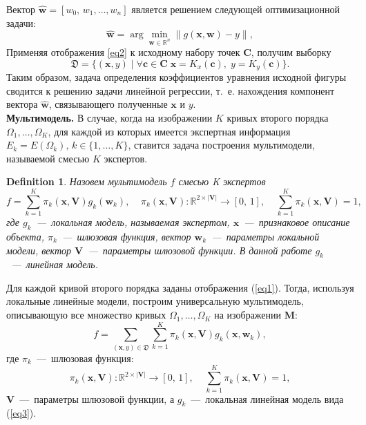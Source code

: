 \documentclass[12pt,twoside]{article}
\newtheorem{definition}{Definition}
\begin{document}
Вектор $\hat{\mathbf{w}}= [w_0, \, w_1, \dots, w_n]$ является решением следующей оптимизационной задачи:  \begin{equation} \hat{\mathbf{w}} = \arg\min_{\mathbf{w}\in\mathbb{R}^n} \|g(\mathbf{x}, \mathbf{w}) - y \|, \end{equation} 
Применяя отображения \eqref{eq2} к исходному набору точек $\mathbf{C}$, получим выборку 
\begin{equation}\label{eq4}
    \mathfrak{D} = \{(\mathbf{x}, y) \; | \; \forall \mathbf{c} \in \mathbf{C} \; \mathbf{x} = K_x(\mathbf{c}), \; y = K_y(\mathbf{c}) \}.
    \end{equation} 
    Таким образом, задача определения коэффициентов уравнения исходной фигуры сводится к решению задачи линейной регрессии, т.~е. нахождения компонент вектора $\hat{\mathbf{w}}$, связывающего полученные $\mathbf{x}$ и $y$. \\
\textbf{Мультимодель.} В случае, когда на изображении $K$ кривых второго порядка  $\Omega_1, \dots, \Omega_K$, для каждой из которых имеется экспертная информация $E_k = E(\Omega_k), \, k \in \{1, \dots, K\}$, ставится задача построения мультимодели, называемой смесью $K$ экспертов. 
\begin{definition} Назовем мультимодель $f$ смесью K экспертов \begin{equation}
  f = \sum\limits_{k = 1}^{K}\pi_k(\mathbf{x}, \mathbf{V})g_k(\mathbf{w}_k),  \; \; \; \; \pi_k(\mathbf{x}, \mathbf{V}): \mathbb{R}^{2\times |\mathbf{V}|} \rightarrow [0, \, 1], \; \; \; \; \sum\limits_{k = 1}^{K}\pi_k(\mathbf{x}, \mathbf{V}) = 1, 
\end{equation} где $g_k$~---~локальная модель, называемая экспертом, $\mathbf{x}$~---~признаковое описание объекта, $\pi_k$~---~шлюзовая функция, вектор $\mathbf{w}_k$~---~параметры локальной модели, вектор $\mathbf{V}$~---~параметры шлюзовой функции. В данной работе $g_k$~---~линейная модель. \end{definition}

Для каждой кривой второго порядка заданы отображения (\ref{eq1}). Тогда, используя локальные линейные модели, построим универсальную мультимодель, описывающую все множество кривых $\Omega_1, \dots, \Omega_K$ на изображении $\mathbf{M}$:
\begin{equation}\label{5}
f = \sum\limits_{(\mathbf{x}, y) \in \mathfrak{D}} \sum\limits_{k = 1}^{K} \pi_k(\mathbf{x}, \mathbf{V})g_k(\mathbf{x}, \mathbf{w}_k), 
\end{equation} где $\pi_k$~---~шлюзовая функция: 
\begin{equation}\label{6}
\pi_k(\mathbf{x}, \mathbf{V}): \mathbb{R}^{2\times |\mathbf{V}|} \rightarrow [0, \, 1], \; \; \; \; \sum\limits_{k = 1}^{K}\pi_k(\mathbf{x}, \mathbf{V}) = 1,\end{equation}
    $\mathbf{V}$~---~параметры шлюзовой функции, а $g_k$~---~локальная линейная модель вида (\ref{eq3}).
    
\end{document}
